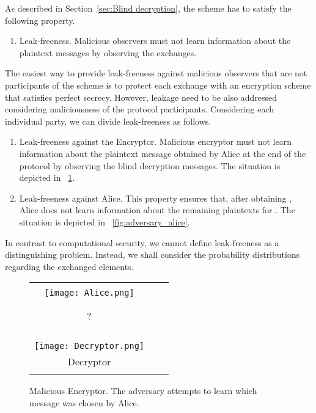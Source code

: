 \documentclass[10pt,journal]{IEEEtran}
\begin{document}
As described in Section~\ref{sec:Blind decryption}, the scheme has to satisfy the following property.
\begin{enumerate}
	\item Leak-freeness. Malicious observers
	must not learn information about the plaintext messages by observing the exchanges.
\end{enumerate}
The easiest way to provide leak-freeness against malicious observers
that are not participants of the scheme
is to
protect each exchange
with an encryption scheme that satisfies perfect secrecy.
However, leakage need to
be also addressed considering maliciousness of the protocol participants.
Considering each individual party, we can divide leak-freeness as follows.
\begin{enumerate}[label*=1.\arabic*)]
	\item Leak-freeness against the Encryptor. Malicious encryptor
	must not learn information about the plaintext message obtained by Alice at the end of the protocol
	by observing the blind decryption messages. The situation is depicted in
\figurename~\ref{fig:malicious_Bob}.
	\item Leak-freeness against Alice. This property ensures that, after obtaining , Alice does not learn information about
	the remaining  plaintexts  for . The situation is depicted in \figurename~\ref{fig:adversary_alice}.
\end{enumerate}
In contrast to computational security, we cannot define
leak-freeness as a distinguishing problem. Instead, we shall consider
the probability distributions regarding the exchanged elements.
\begin{figure}[!t]
\centering
\begin{tabular}{ccc}
\ovalbox{\begin{minipage}{0.3\columnwidth}
\centering
Alice\\
\vspace{0.1cm}
\texttt{[image: Alice.png]}\\

\end{minipage}
}
&  & 
\color{red}
\Ovalbox{\begin{minipage}{0.3\columnwidth}
\centering
Adversary\\
\\
?
\end{minipage}
}\\
 & & \\
 & & \\
 & & \\
\ovalbox{\begin{minipage}{0.25\columnwidth}
\centering
\\
\vspace{0.1cm}
\texttt{[image: Decryptor.png]}\\
\vspace{-0.1cm}
Decryptor\\
\end{minipage}
}
\end{tabular}
\caption{Malicious Encryptor. The adversary attempts to learn which message was chosen by Alice.}
\label{fig:malicious_Bob}
\end{figure}
\end{document}
